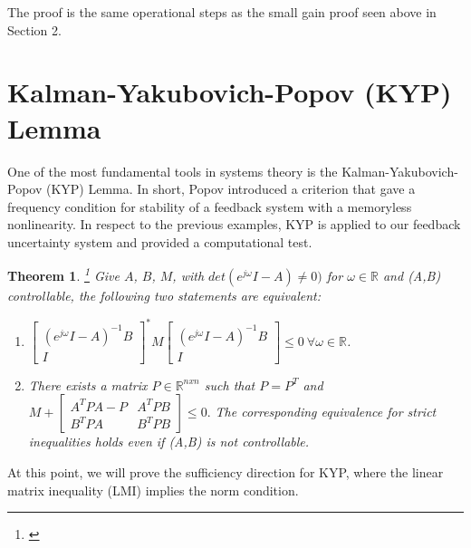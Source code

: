 \documentclass{article}[12pt]
\newtheorem{theorem}{Theorem}
\begin{document}
\noindent The proof is the same operational steps as the small gain proof seen above in Section 2.
\section{Kalman-Yakubovich-Popov (KYP) Lemma }
One of the most fundamental tools in systems theory is the Kalman-Yakubovich-Popov (KYP) Lemma. In short, Popov introduced a criterion that gave a frequency condition for stability of a feedback system with a memoryless nonlinearity. In respect to the previous examples, KYP is applied to our feedback uncertainty system and provided a computational test.
\begin{theorem}\footnote{\cite{RANTZER19967}}
Give $A$, $B$, $M$, with $det(e^{j\omega} I - A) \neq 0)$ for $\omega  \in \mathbb{R}$ and (A,B) controllable, the following two statements are equivalent:
\begin{enumerate}
    \item  
    $\begin{bmatrix}
        (e^{j\omega}I - A)^{-1}B \\
        I
    \end{bmatrix}^{*} M
    \begin{bmatrix}
        (e^{j\omega}I - A)^{-1}B \\
        I
    \end{bmatrix} \leq 0 \: \forall \omega \in \mathbb{R}$.
    
    \item There exists a matrix $P \in \mathbb{R}^{nxn}$ such that $P = P^T$ and
    $M + 
    \begin{bmatrix}
        A^{T}PA - P & A^T PB \\
         B^{T}PA & B^T PB
    \end{bmatrix} \leq 0.
    $
    The corresponding equivalence for strict inequalities holds even if (A,B) is not controllable.
    \end{enumerate}
\end{theorem}
\noindent At this point, we will prove the sufficiency direction for KYP, where the linear matrix inequality (LMI) implies the norm condition. 
\end{document}
